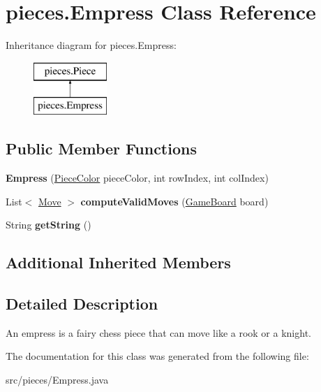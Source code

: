 \hypertarget{classpieces_1_1_empress}{}\section{pieces.\+Empress Class Reference}
\label{classpieces_1_1_empress}
Inheritance diagram for pieces.\+Empress\+:\begin{figure}[H]
\begin{center}
\leavevmode
\includegraphics[height=2.000000cm]{classpieces_1_1_empress}
\end{center}
\end{figure}
\subsection*{Public Member Functions}
\begin{DoxyCompactItemize}
\item 
\mbox{\label{classpieces_1_1_empress_a9482176b701a120d10b05d6d06c12102}} 
{\bfseries Empress} (\mbox{\hyperlink{enumpieces_1_1_piece_1_1_piece_color}{Piece\+Color}} piece\+Color, int row\+Index, int col\+Index)
\item 
\mbox{\label{classpieces_1_1_empress_a95061ef2f7ef2262f49a56e9af536509}} 
List$<$ \mbox{\hyperlink{classpieces_1_1_move}{Move}} $>$ {\bfseries compute\+Valid\+Moves} (\mbox{\hyperlink{classgameboard_1_1_game_board}{Game\+Board}} board)
\item 
\mbox{\label{classpieces_1_1_empress_a53a67ce2a10d71075587af667189b84f}} 
String {\bfseries get\+String} ()
\end{DoxyCompactItemize}
\subsection*{Additional Inherited Members}


\subsection{Detailed Description}
An empress is a fairy chess piece that can move like a rook or a knight. 

The documentation for this class was generated from the following file\+:\begin{DoxyCompactItemize}
\item 
src/pieces/Empress.\+java\end{DoxyCompactItemize}
